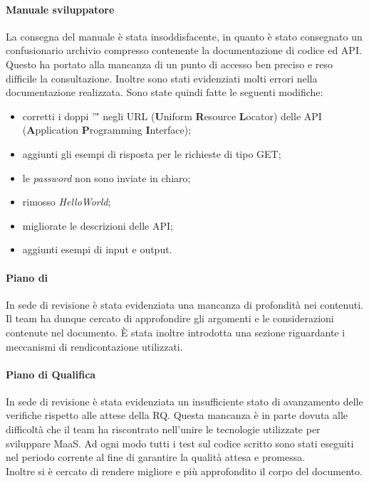 \paragraph*{Manuale sviluppatore}
La consegna del manuale è stata insoddisfacente, in quanto è stato consegnato un confusionario archivio compresso contenente la documentazione di codice ed API. Questo ha portato alla mancanza di un punto di accesso ben preciso e reso difficile la consultazione. Inoltre sono stati evidenziati molti errori nella documentazione realizzata. Sono state quindi fatte le seguenti modifiche:
\begin{itemize}
\item corretti i doppi ''\'' negli URL (\textbf{U}niform \textbf{R}esource \textbf{L}ocator) delle API (\textbf{A}pplication \textbf{P}rogramming \textbf{I}nterface);
\item aggiunti gli esempi di risposta per le richieste di tipo GET;
\item le \textit{password} non sono inviate in chiaro;
\item rimosso \textit{HelloWorld};
\item migliorate le descrizioni delle API;
\item aggiunti esempi di input e output.
\end{itemize}

\paragraph*{Piano di }
In sede di revisione è stata evidenziata una mancanza di profondità nei contenuti. Il team ha dunque cercato di approfondire gli argomenti e le considerazioni contenute nel documento. È stata inoltre introdotta una sezione riguardante i meccanismi di rendicontazione utilizzati.

\paragraph*{Piano di Qualifica}
In sede di revisione è stata evidenziata un insufficiente stato di avanzamento delle verifiche rispetto alle attese della RQ. Questa mancanza è in parte dovuta alle difficoltà che il team ha riscontrato nell'unire le tecnologie utilizzate per sviluppare MaaS. Ad ogni modo tutti i test sul codice scritto sono stati eseguiti nel periodo corrente al fine di garantire la qualità attesa e promessa. \\
Inoltre si è cercato di rendere migliore e più approfondito il corpo del documento.